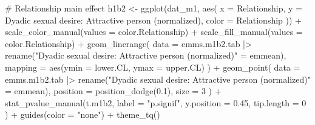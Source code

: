 \documentclass[
  bookmarksnumbered]{article}
\newenvironment{Shaded}{\begin{snugshade}}{\end{snugshade}}
\newcommand{\AttributeTok}[1]{\textcolor[rgb]{0.80,0.80,0.80}{#1}}
\newcommand{\CommentTok}[1]{\textcolor[rgb]{0.50,0.62,0.50}{#1}}
\newcommand{\DecValTok}[1]{\textcolor[rgb]{0.86,0.86,0.80}{#1}}
\newcommand{\FloatTok}[1]{\textcolor[rgb]{0.75,0.75,0.82}{#1}}
\newcommand{\FunctionTok}[1]{\textcolor[rgb]{0.94,0.94,0.56}{#1}}
\newcommand{\NormalTok}[1]{\textcolor[rgb]{0.80,0.80,0.80}{#1}}
\newcommand{\OtherTok}[1]{\textcolor[rgb]{0.94,0.94,0.56}{#1}}
\newcommand{\SpecialCharTok}[1]{\textcolor[rgb]{0.86,0.64,0.64}{#1}}
\newcommand{\StringTok}[1]{\textcolor[rgb]{0.80,0.58,0.58}{#1}}
\begin{document}
\begin{Shaded}
\begin{Highlighting}[]
\CommentTok{\# Relationship main effect}
\NormalTok{h1b2 }\OtherTok{\textless{}{-}} \FunctionTok{ggplot}\NormalTok{(dat\_m1, }\FunctionTok{aes}\NormalTok{(}
  \AttributeTok{x =}\NormalTok{ Relationship, }\AttributeTok{y =} \StringTok{\textasciigrave{}}\AttributeTok{Dyadic sexual desire: Attractive person (normalized)}\StringTok{\textasciigrave{}}\NormalTok{,}
  \AttributeTok{color =}\NormalTok{ Relationship}
\NormalTok{)) }\SpecialCharTok{+}
  \FunctionTok{scale\_color\_manual}\NormalTok{(}\AttributeTok{values =}\NormalTok{ color.Relationship) }\SpecialCharTok{+}
  \FunctionTok{scale\_fill\_manual}\NormalTok{(}\AttributeTok{values =}\NormalTok{ color.Relationship) }\SpecialCharTok{+}
  \FunctionTok{geom\_linerange}\NormalTok{(}
    \AttributeTok{data =}\NormalTok{ emms.m1b2.tab }\SpecialCharTok{|\textgreater{}}
      \FunctionTok{rename}\NormalTok{(}\StringTok{"Dyadic sexual desire: Attractive person (normalized)"} \OtherTok{=}\NormalTok{ emmean),}
    \AttributeTok{mapping =} \FunctionTok{aes}\NormalTok{(}\AttributeTok{ymin =}\NormalTok{ lower.CL, }\AttributeTok{ymax =}\NormalTok{ upper.CL)}
\NormalTok{  ) }\SpecialCharTok{+}
  \FunctionTok{geom\_point}\NormalTok{(}
    \AttributeTok{data =}\NormalTok{ emms.m1b2.tab }\SpecialCharTok{|\textgreater{}}
      \FunctionTok{rename}\NormalTok{(}\StringTok{"Dyadic sexual desire: Attractive person (normalized)"} \OtherTok{=}\NormalTok{ emmean),}
    \AttributeTok{position =} \FunctionTok{position\_dodge}\NormalTok{(}\FloatTok{0.1}\NormalTok{),}
    \AttributeTok{size =} \DecValTok{3}
\NormalTok{  ) }\SpecialCharTok{+}
  \FunctionTok{stat\_pvalue\_manual}\NormalTok{(t.m1b2,}
    \AttributeTok{label =} \StringTok{"p.signif"}\NormalTok{,}
    \AttributeTok{y.position =} \FloatTok{0.45}\NormalTok{,}
    \AttributeTok{tip.length =} \DecValTok{0}
\NormalTok{  ) }\SpecialCharTok{+}
  \FunctionTok{guides}\NormalTok{(}\AttributeTok{color =} \StringTok{"none"}\NormalTok{) }\SpecialCharTok{+}
  \FunctionTok{theme\_tq}\NormalTok{()}


\end{Highlighting}
\end{Shaded}
\end{document}
